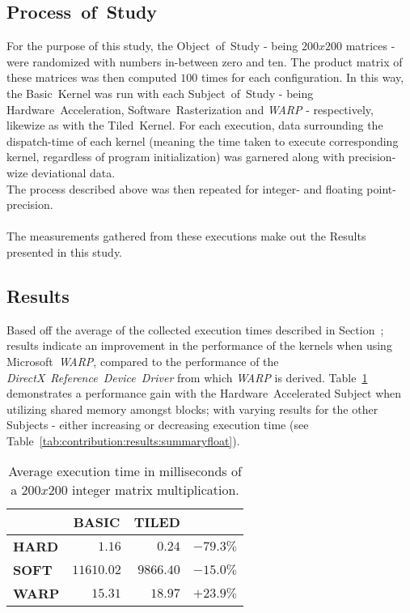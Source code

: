 \documentclass[a4paper,twocolumn,10pt]{article}
\begin{document}
\subsection{Process~of~Study}
\label{sec:contribution:processofstudy}
For the purpose of this study, the Object~of~Study - being $200x200$ matrices - were randomized with numbers in-between zero and ten. The product matrix of these matrices was then computed $100$ times for each configuration. In this way, the Basic~Kernel was run with each Subject~of~Study - being Hardware~Acceleration, Software~Rasterization and \textit{WARP} - respectively, likewize as with the Tiled~Kernel. For each execution, data surrounding the dispatch-time of each kernel (meaning the time taken to execute corresponding kernel, regardless of program initialization) was garnered along with precision-wize deviational data.\\
The process described above was then repeated for integer- and floating point-precision.\\
\\
The measurements gathered from these executions make out the Results presented in this study.

\subsection{Results}
\label{sec:contribution:results}
Based off the average of the collected execution times described in Section~; results indicate an improvement in the performance of the kernels when using Microsoft~\textit{WARP}, compared to the performance of the \textit{DirectX}~\textit{Reference~Device~Driver} from which \textit{WARP} is derived. Table~\ref{tab:contribution:results:summaryint} demonstrates a performance gain with the Hardware~Accelerated Subject when utilizing shared memory amongst blocks; with varying results for the other Subjects - either increasing or decreasing execution time (see Table~\ref{tab:contribution:results:summaryfloat}).

\begin{table}[hbt]
\begin{center}
\begin{tabular}{r|r|r|r|}
	\cline{2-3}
							& \multicolumn{1}{|c|}{\textbf{BASIC}} & \multicolumn{1}{|c|}{\textbf{TILED}}	\\ \hline
	\multicolumn{1}{|l|}{\textbf{HARD}}	& $1.16$			& $0.24$ 	& $-79.3\%$  					\\ \hline
	\multicolumn{1}{|l|}{\textbf{SOFT}}	& $11610.02$		& $9866.40$	& $-15.0\%$   					\\ \hline
	\multicolumn{1}{|l|}{\textbf{WARP}}	& $15.31$			& $18.97$	& $+23.9\%$   					\\ \hline
\end{tabular}
\end{center}
\caption{Average execution time in milliseconds of a $200x200$ integer matrix multiplication.}
\label{tab:contribution:results:summaryint}
\end{table}
\end{document}
